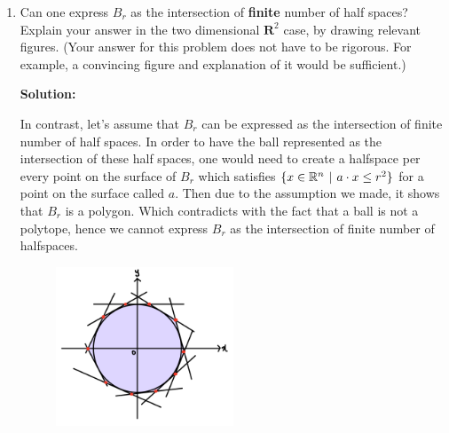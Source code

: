 \documentclass[12pt]{article}
\newenvironment{solution}
  {\par\noindent\textbf{Solution:}\par}
  {\par}
\begin{document}
\begin{enumerate}
\begin{enumerate}[label=\alph*.]
\begin{solution}
      \end{solution}
    \item Can one express $B_r$ as the intersection of \textbf{finite} number of half spaces? Explain your answer in the two dimensional $\mathbf{R}^2$ case, by drawing relevant figures. (Your answer for this problem does not have to be rigorous. For example, a convincing figure and explanation of it would be sufficient.)
      \begin{solution}
        In contrast, let's assume that $B_r$ can be expressed as the intersection of finite number of half spaces. In order to have the ball represented as the intersection of these half spaces,
        one would need to create a halfspace per every point on the surface of $B_r$ which satisfies $\{ x \in \mathbb{R}^n \hspace{.05in} \vert \hspace{.05in} a \cdot x \le r^2 \}$ for a point on the surface called $a$.
        Then due to the assumption we made, it shows that $B_r$ is a polygon. Which contradicts with the fact that a ball is not a polytope, hence we cannot express $B_r$ as the intersection of finite number of halfspaces.
         \begin{figure}[H]
        \centering
        \includegraphics[width=0.5\textwidth]{figure3.jpg} 
      \end{figure}

      \end{solution}
  \end{enumerate}


\end{enumerate}
\end{document}
